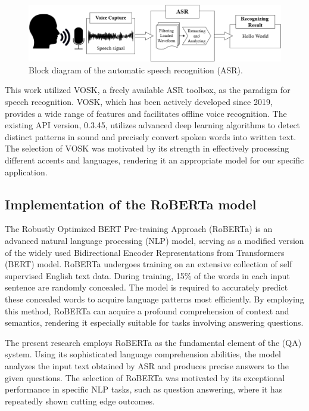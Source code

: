 \documentclass{../styles/svproc}
\begin{document}
\begin{figure}[t]
	\centering
	\includegraphics[width=1\textwidth]{./images/asr.png}
	\caption{Block diagram of the automatic speech recognition (ASR).}
	\label{fig:asr}
\end{figure}

This work utilized VOSK, a freely available ASR toolbox, as the paradigm for speech recognition. VOSK, which has been actively developed since 2019, provides a wide range of features and facilitates offline voice recognition. The existing API version, 0.3.45, utilizes advanced deep learning algorithms to detect distinct patterns in sound and precisely convert spoken words into written text. The selection of VOSK was motivated by its strength in effectively processing different accents and languages, rendering it an appropriate model for our specific application.

\subsection{Implementation of the RoBERTa model}
The Robustly Optimized BERT Pre-training Approach (RoBERTa) is an advanced natural language processing (NLP) model, serving as a modified version of the widely used Bidirectional Encoder Representations from Transformers (BERT) model. RoBERTa undergoes training on an extensive collection of self supervised English text data. During training, 15\% of the words in each input sentence are randomly concealed. The model is required to accurately predict these concealed words to acquire language patterns most efficiently. By employing this method, RoBERTa can acquire a profound comprehension of context and semantics, rendering it especially suitable for tasks involving answering questions.

The present research employs RoBERTa as the fundamental element of the (QA) system. Using its sophisticated language comprehension abilities, the model analyzes the input text obtained by ASR and produces precise answers to the given questions. The selection of RoBERTa was motivated by its exceptional performance in specific NLP tasks, such as question answering, where it has repeatedly shown cutting edge outcomes.
\end{document}
